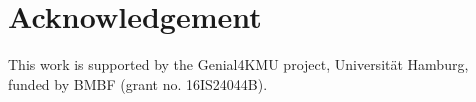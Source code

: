 \documentclass[11pt]{article}
\begin{document}


%

\section*{Acknowledgement}
This work is supported by the Genial4KMU project, Universität Hamburg, funded by BMBF (grant no. 16IS24044B).




\clearpage
\appendix
\end{document}
